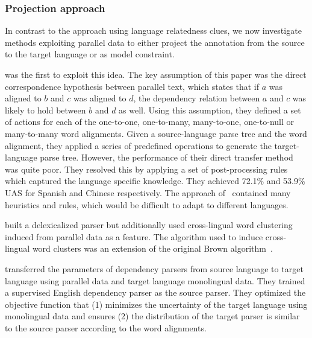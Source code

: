 \documentclass[12pt,twoside,final,hidelinks]{ltthesis}
\theoremstyle{definition}
\begin{document}
\subsubsection{Projection approach}
In contrast to the approach using language relatedness clues, we now investigate methods exploiting parallel data to either project the annotation from the source to the target language or as model constraint. 

 was the first to exploit this idea. The key assumption of this paper was the direct correspondence hypothesis between parallel text, which states that if $a$ was aligned to $b$ and $c$ was aligned to $d$, the dependency relation between $a$ and $c$ was likely to hold between $b$ and $d$ as well. Using this assumption, they defined a set of actions for each of the one-to-one, one-to-many, many-to-one, one-to-null or many-to-many word alignments. Given a source-language parse tree and the word alignment, they applied a series of predefined operations to generate the target-language parse tree. However, the performance of their direct transfer method was quite poor. They resolved this by applying a set of post-processing rules which captured the language specific knowledge. They achieved 72.1\% and 53.9\% UAS for Spanish and Chinese respectively. The approach of~ contained many heuristics and rules, which would be difficult to adapt to different languages. 

 built a delexicalized parser but additionally used cross-lingual word clustering induced from parallel data as a feature. The algorithm used to induce cross-lingual word clusters was an extension of the original Brown algorithm~\cite{Brown:1992}. 

 transferred the parameters of dependency parsers from source language to target language using parallel data and target language monolingual data. They trained a supervised English dependency parser as the source parser. They optimized the objective function that (1) minimizes the uncertainty of the target language using monolingual data and ensures (2) the distribution of the target parser is similar to the source parser according to the word alignments. 
\end{document}
